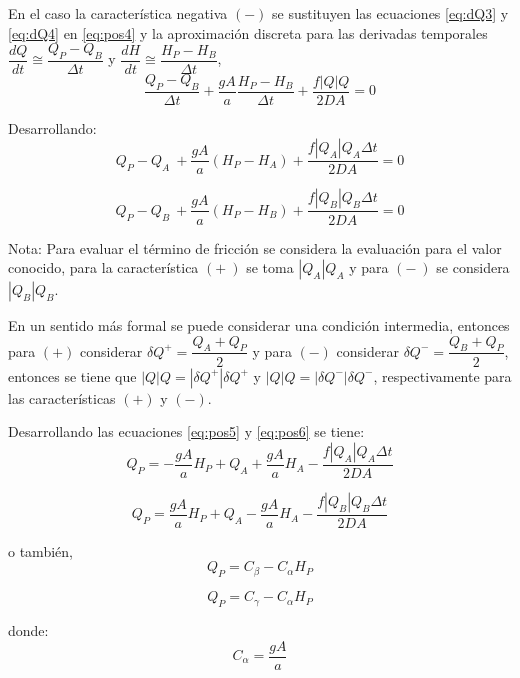 \documentclass[letterpaper]{report}
\begin{document}
En el caso la característica negativa $(-)$ se sustituyen las ecuaciones \ref{eq:dQ3} y \ref{eq:dQ4} en \ref{eq:pos4} y la aproximación discreta para las derivadas temporales $\dfrac{dQ}{dt}\cong \dfrac{Q_P-Q_B}{\Delta t}$ y $\dfrac{dH}{dt} \cong \dfrac{H_P-H_B}{\Delta t}$, 
\begin{equation}
	\dfrac{Q_P-Q_B}{\Delta t} + \dfrac{gA}{a}\dfrac{H_P-H_B}{\Delta t}+\dfrac{f|Q|Q}{2DA}=0
\end{equation}

Desarrollando:
\begin{equation}
	Q_P-Q_A\ +\frac{gA}{a}(H_P-H_A)+\dfrac{f|Q_A|Q_A\Delta t}{2DA}=0
\label{eq:pos5}
\end{equation}

\begin{equation}
	Q_P-Q_B\ +\frac{gA}{a}(H_P-H_B)+\dfrac{f|Q_B|Q_B\Delta t}{2DA}=0
	\label{eq:pos6}
\end{equation}

Nota: Para evaluar el término de fricción se considera la evaluación para el valor conocido, para la característica $(+\:)$ se toma $|Q_A|Q_A$ y para $(-\:)$ se considera $|Q_B|Q_B$.\bigskip
 
En un sentido más formal se puede considerar una condición intermedia, entonces para $(+)$ considerar $\delta Q^+=\dfrac{Q_A+Q_P}{2}$ y para $(-)$ considerar $\delta Q^-=\dfrac{Q_B+Q_P}{2}$, entonces se tiene que $|Q|Q=|\delta Q^+|\delta Q^+$ y $|Q|Q=|\delta Q^-|\delta Q^-$, respectivamente para las características $(+)$ y $(-)$.\bigskip

Desarrollando las ecuaciones \ref{eq:pos5} y \ref{eq:pos6} se tiene:
\begin{equation*}
	Q_P=-\dfrac{gA}{a}H_P+Q_A+\dfrac{gA}{a}H_A-\dfrac{f|Q_A|Q_A \Delta t}{2DA}
\end{equation*}

\begin{equation*}
	Q_P=\dfrac{gA}{a}H_P+Q_A-\dfrac{gA}{a}H_A-\dfrac{f|Q_B|Q_B \Delta t}{2DA}
\end{equation*}

o también,
\begin{equation}
	Q_P=C_\beta-C_\alpha H_P
\label{eq:qp1}
\end{equation}

\begin{equation}
	Q_P=C_\gamma-C_\alpha H_P
\label{eq:qp2}
\end{equation}

donde:
\begin{equation}
	C_\alpha=\dfrac{gA}{a}
\label{eq:qp3}
\end{equation}
\end{document}
